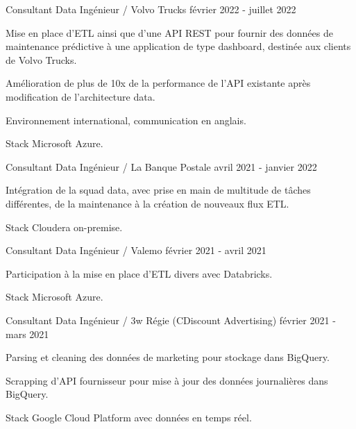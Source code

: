 \begin{cventries}
	\cventry
	{Consultant Data Ingénieur / Volvo Trucks}{}{}
	{février 2022 - juillet 2022}
	{
		\begin{cvitems}
			\item Mise en place d'ETL ainsi que d'une API REST pour fournir des données de maintenance prédictive à une application de type dashboard, destinée aux clients de Volvo Trucks.
			\item Amélioration de plus de 10x de la performance de l'API existante après modification de l'architecture data.
			\item Environnement international, communication en anglais.
			\item Stack Microsoft Azure.
		\end{cvitems}
	}
	
	\cventry
	{Consultant Data Ingénieur / La Banque Postale}{}{}
	{avril 2021 - janvier 2022}
	{
		\begin{cvitems}
			\item Intégration de la squad data, avec prise en main de multitude de tâches différentes, de la maintenance à la création de nouveaux flux ETL.
			\item Stack Cloudera on-premise.
		\end{cvitems}
	}
	
	\newpage

	\cventry
	{Consultant Data Ingénieur / Valemo}{}{}
	{février 2021 - avril 2021}
	{
		\begin{cvitems}
			\item Participation à la mise en place d'ETL divers avec Databricks.
			\item Stack Microsoft Azure.
		\end{cvitems}
	}
	
	\cventry
	{Consultant Data Ingénieur / 3w Régie (CDiscount Advertising)}{}{}
	{février 2021 - mars 2021}
	{
		\begin{cvitems}
			\item Parsing et cleaning des données de marketing pour stockage dans BigQuery.
			\item Scrapping d'API fournisseur pour mise à jour des données journalières dans BigQuery.
			\item Stack Google Cloud Platform avec données en temps réel.
		\end{cvitems}
	}
	

\end{cventries}
